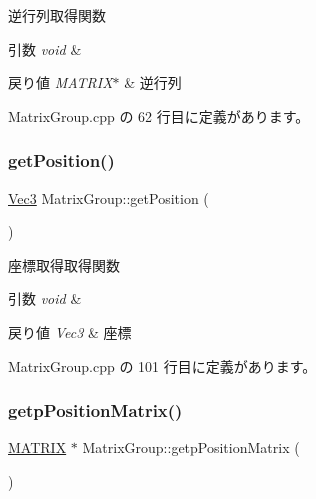 逆行列取得関数 


\begin{DoxyParams}{引数}
{\em void} & \\
\hline
\end{DoxyParams}

\begin{DoxyRetVals}{戻り値}
{\em M\+A\+T\+R\+I\+X$\ast$} & 逆行列 \\
\hline
\end{DoxyRetVals}


 Matrix\+Group.\+cpp の 62 行目に定義があります。

\mbox{\label{class_matrix_group_a4d8785ad38523bba65ae5de3fc1b5202}} 
\subsubsection{\texorpdfstring{get\+Position()}{getPosition()}}
{\footnotesize\ttfamily \mbox{\hyperlink{_vector3_d_8h_ab16f59e4393f29a01ec8b9bbbabbe65d}{Vec3}} Matrix\+Group\+::get\+Position (\begin{DoxyParamCaption}{ }\end{DoxyParamCaption})}



座標取得取得関数 


\begin{DoxyParams}{引数}
{\em void} & \\
\hline
\end{DoxyParams}

\begin{DoxyRetVals}{戻り値}
{\em Vec3} & 座標 \\
\hline
\end{DoxyRetVals}


 Matrix\+Group.\+cpp の 101 行目に定義があります。

\mbox{\label{class_matrix_group_a98e52fd85547a0ce918072170e15ea9e}} 
\subsubsection{\texorpdfstring{getp\+Position\+Matrix()}{getpPositionMatrix()}}
{\footnotesize\ttfamily \mbox{\hyperlink{_matrix_8h_a032295cd9fb1b711757c90667278e744}{M\+A\+T\+R\+IX}} $\ast$ Matrix\+Group\+::getp\+Position\+Matrix (\begin{DoxyParamCaption}{ }\end{DoxyParamCaption})}



